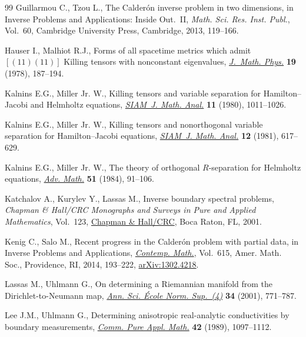 \documentclass[11pt]{article}
\numberwithin{equation}{section}
\begin{document}
\begin{thebibliography}{99}
Guillarmou C., Tzou L., The {C}alder\'{o}n inverse problem in two dimensions,
 in Inverse Problems and Applications: Inside Out.~{II}, \textit{Math. Sci.
 Res. Inst. Publ.}, Vol.~60, Cambridge University Press, Cambridge, 2013,
 119--166.

Hauser I., Malhiot R.J., Forms of all spacetime metrics which admit {$[(11)
 (11)]$} {K}illing tensors with nonconstant eigenvalues, \href{https://doi.org/10.1063/1.523523}{\textit{J.~Math.
 Phys.}} \textbf{19} (1978), 187--194.

Kalnins E.G., Miller Jr. W., Killing tensors and variable separation for
 {H}amilton--{J}acobi and {H}elmholtz equations, \href{https://doi.org/10.1137/0511089}{\textit{SIAM~J. Math. Anal.}}
 \textbf{11} (1980), 1011--1026.

Kalnins E.G., Miller Jr. W., Killing tensors and nonorthogonal variable
 separation for {H}amilton--{J}acobi equations, \href{https://doi.org/10.1137/0512054}{\textit{SIAM~J. Math. Anal.}}
 \textbf{12} (1981), 617--629.

Kalnins E.G., Miller Jr. W., The theory of orthogonal {$R$}-separation for
 {H}elmholtz equations, \href{https://doi.org/10.1016/0001-8708(84)90004-5}{\textit{Adv. Math.}} \textbf{51} (1984), 91--106.

Katchalov A., Kurylev Y., Lassas M., Inverse boundary spectral problems,
\textit{Chapman \& Hall/CRC Monographs and Surveys in Pure and Applied
 Mathematics}, Vol.~123, \href{https://doi.org/10.1201/9781420036220}{Chapman \& Hall/CRC}, Boca Raton, FL, 2001.

Kenig C., Salo M., Recent progress in the {C}alder\'{o}n problem with partial
 data, in Inverse Problems and Applications, \href{https://doi.org/10.1090/conm/615/12245}{\textit{Contemp. Math.}}, Vol.~615, Amer. Math. Soc., Providence, RI, 2014, 193--222, \href{https://arxiv.org/abs/1302.4218}{arXiv:1302.4218}.

Lassas M., Uhlmann G., On determining a {R}iemannian manifold from the
 {D}irichlet-to-{N}eumann map, \href{https://doi.org/10.1016/S0012-9593(01)01076-X}{\textit{Ann. Sci. \'Ecole Norm. Sup.~(4)}}
 \textbf{34} (2001), 771--787.

Lee J.M., Uhlmann G., Determining anisotropic real-analytic conductivities by
 boundary measurements, \href{https://doi.org/10.1002/cpa.3160420804}{\textit{Comm. Pure Appl. Math.}} \textbf{42} (1989),
 1097--1112.


\end{thebibliography}
\end{document}
